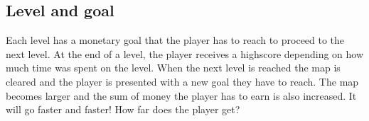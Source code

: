 \subsection*{Level and goal}
    Each level has a monetary goal that the player has to reach to proceed to
    the next level. At the end of a level, the player receives a highscore
    depending on how much time was spent on the level. When  the next level is
    reached the map is cleared and the player is presented with a new goal they
    have to reach. The map becomes larger and the sum of money the player has to
    earn is also increased. It will go faster and faster! How far does the player
    get?
